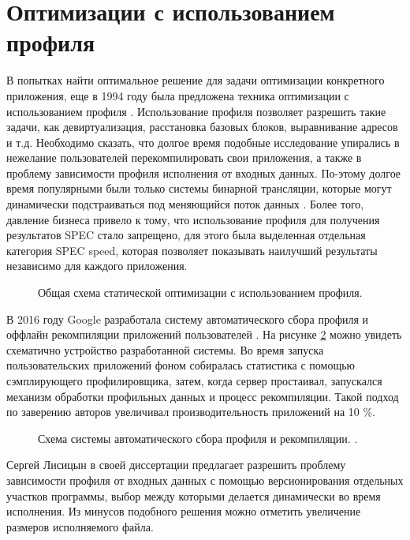 \section{Оптимизации с использованием профиля} \label{pr:pgo}
В попытках  найти оптимальное решение для задачи оптимизации конкретного приложения, еще в 1994 году была предложена техника оптимизации с использованием профиля \cite{liew1994feedback}. Использование профиля позволяет разрешить такие задачи, как девиртуализация, расстановка базовых блоков, выравнивание адресов и т.д. Необходимо сказать, что долгое время подобные исследование упирались в нежелание пользователей перекомпилировать свои приложения, а также в проблему зависимости профиля исполнения от входных данных. По-этому долгое  время популярными были только системы бинарной трансляции, которые могут динамически подстраиваться под меняющийся поток данных \cite{dange2014systematic}. Более того, давление бизнеса привело к тому, что использование профиля для получения результатов SPEC стало запрещено, для этого была выделенная отдельная категория SPEC speed, которая позволяет показывать наилучший результаты независимо для каждого приложения.
 \begin{figure}[htbp]
	\centering
	
	\caption{Общая схема статической оптимизации с использованием профиля.}
	\label{partReview:fdo1}
\end{figure}

В 2016 году Google разработала систему автоматического сбора профиля и оффлайн рекомпиляции приложений пользователей \cite{chen2016autofdo}. На рисунке \ref{partReview:fdo2} можно увидеть схематично устройство разработанной системы. Во время запуска пользовательских приложений фоном собиралась статистика с помощью сэмплирующего профилировщика, затем, когда сервер простаивал, запускался механизм обработки профильных данных и процесс рекомпиляции. Такой подход по заверению авторов увеличивал производительность приложений на 10 \%.  

\begin{figure}[ht]
	\caption{Схема системы автоматического сбора профиля и рекомпиляции. \cite{chen2016autofdo}.}\label{partReview:fdo2}
\end{figure}

Сергей Лисицын  в своей диссертации \cite{SergeyL1} предлагает разрешить проблему зависимости профиля от входных данных с помощью версионирования отдельных участков программы, выбор между которыми делается динамически во время исполнения. Из минусов подобного решения можно отметить увеличение размеров исполняемого файла.

